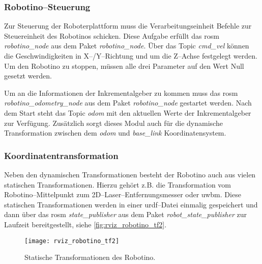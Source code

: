 \begin{comment}
--------------------------------------------------------------------------------
- \url{http://wiki.ros.org/robotino_node}
- todo: Service reset_odometry
\end{comment}
\subsubsection{Robotino--Steuerung}

Zur Steuerung der Roboterplattform muss die Verarbeitungseinheit Befehle zur Steuereinheit des Robotinos schicken. Diese Aufgabe erfüllt das \Gls{rosm} \textit{robotino\_node} aus dem Paket \textit{robotino\_node}. Über das Topic \textit{cmd\_vel} können die Geschwindigkeiten in X--/Y--Richtung und um die Z--Achse festgelegt werden. Um den Robotino zu stoppen, müssen alle drei Parameter auf den Wert Null gesetzt werden.

Um an die Informationen der Inkrementalgeber zu kommen muss das \Gls{rosm} \textit{robotino\_odometry\_node} aus dem Paket \textit{robotino\_node} gestartet werden. Nach dem Start steht das Topic \textit{odom} mit den aktuellen Werte der Inkrementalgeber zur Verfügung. Zusätzlich sorgt dieses Modul auch für die dynamische Transformation zwischen dem \textit{odom} und \textit{base\_link} Koordinatensystem.


\begin{comment}
--------------------------------------------------------------------------------
- \url{http://wiki.ros.org/robot_state_publisher}
- \url{http://wiki.ros.org/urdf}
\end{comment}
\subsubsection{Koordinatentransformation}

Neben den dynamischen Transformationen besteht der Robotino auch aus vielen statischen Transformationen. Hierzu gehört z.B. die Transformation vom Robotino--Mittelpunkt zum 2D--Laser--Entfernungsmesser oder \Gls{uwbm}. Diese statischen Transformationen werden in einer \Gls{urdf}--Datei einmalig gespeichert und dann über das \Gls{rosm} \textit{state\_publisher} aus dem Paket \textit{robot\_state\_publisher} zur Laufzeit bereitgestellt, siehe \autoref{fig:rviz_robotino_tf2}.

\begin{figure}[h]
	\centering
	\texttt{[image: rviz\_robotino\_tf2]}
	\caption{Statische Transformationen des Robotino.}
	\label{fig:rviz_robotino_tf2}
\end{figure}


